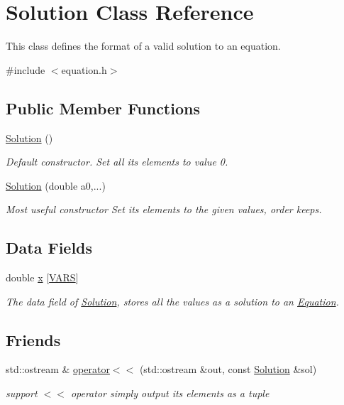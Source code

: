 \hypertarget{classSolution}{}\section{Solution Class Reference}
\label{classSolution}


This class defines the format of a valid solution to an equation.  




{\ttfamily \#include $<$equation.\+h$>$}

\subsection*{Public Member Functions}
\begin{DoxyCompactItemize}
\item 
\hyperlink{classSolution_ab55bd4b023d596ce11aaf737b9a6123b}{Solution} ()
\begin{DoxyCompactList}\small\item\em Default constructor. Set all its elements to value 0. \end{DoxyCompactList}\item 
\hyperlink{classSolution_a2b382bc23a6b180f2ed161707da039dd}{Solution} (double a0,...)
\begin{DoxyCompactList}\small\item\em Most useful constructor Set its elements to the given values, order keeps. \end{DoxyCompactList}\end{DoxyCompactItemize}
\subsection*{Data Fields}
\begin{DoxyCompactItemize}
\item 
double \hyperlink{classSolution_a67672e91e753de458afef2ca270510dd}{x} \mbox{[}\hyperlink{config_8h_a1d6565a8ececd15de44965eec4790919}{V\+A\+RS}\mbox{]}
\begin{DoxyCompactList}\small\item\em The data field of \hyperlink{classSolution}{Solution}, stores all the values as a solution to an \hyperlink{classEquation}{Equation}. \end{DoxyCompactList}\end{DoxyCompactItemize}
\subsection*{Friends}
\begin{DoxyCompactItemize}
\item 
std\+::ostream \& \hyperlink{classSolution_a57557999df406fb734b29cff24838d80}{operator$<$$<$} (std\+::ostream \&out, const \hyperlink{classSolution}{Solution} \&sol)
\begin{DoxyCompactList}\small\item\em support $<$$<$ operator simply output its elements as a tuple \end{DoxyCompactList}\end{DoxyCompactItemize}


